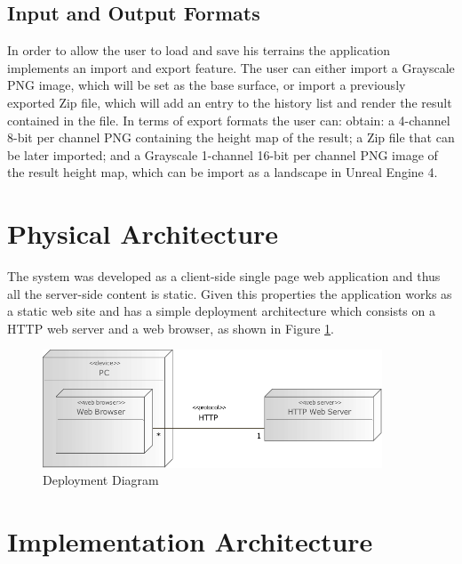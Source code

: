     \subsection {Input and Output Formats}
    
      In order to allow the user to load and save his terrains the application implements an import and export feature. The user can either import a Grayscale PNG image, which will be set as the base surface, or import a previously exported Zip file, which will add an entry to the history list and render the result contained in the file. In terms of export formats the user can: obtain: a 4-channel 8-bit per channel PNG containing the height map of the result; a Zip file that can be later imported; and a Grayscale 1-channel 16-bit per channel PNG image of the result height map, which can be import as a landscape in Unreal Engine 4.

  \section {Physical Architecture} %
    
    The system was developed as a client-side single page web application and thus all the server-side content is static. Given this properties the application works as a static web site and has a simple deployment architecture which consists on a HTTP web server and a web browser, as shown in Figure \ref{fig:deployment_diagram}.
    
    \begin{figure}[h!]
    	\begin{center}
    		\includegraphics[width=0.9\textwidth]{images/diagrams/deployment.pdf}
    	\end{center}
    	\caption{Deployment Diagram}
    	\label{fig:deployment_diagram}
    \end{figure}
    
  \section {Implementation Architecture} %
    
